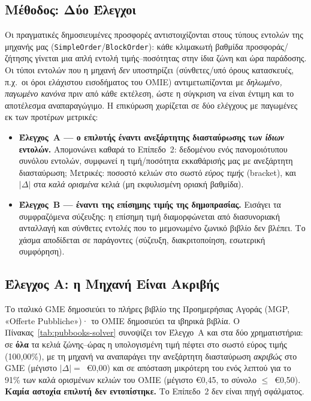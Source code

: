 \subsection{Μέθοδος: Δύο Έλεγχοι}
\label{subsec:pubbooks-method}

Οι πραγματικές δημοσιευμένες προσφορές αντιστοιχίζονται στους τύπους εντολών της μηχανής μας (\texttt{SimpleOrder}/\texttt{BlockOrder}): κάθε κλιμακωτή βαθμίδα προσφοράς/ζήτησης γίνεται μια απλή εντολή τιμής--ποσότητας στην ίδια ζώνη και ώρα παράδοσης. Οι τύποι εντολών που η μηχανή \emph{δεν} υποστηρίζει (σύνθετες/υπό όρους κατασκευές, π.χ.\ οι όροι ελάχιστου εισοδήματος του OMIE) αντιμετωπίζονται με \emph{δηλωμένο, παγωμένο κανόνα} πριν από κάθε εκτέλεση, ώστε η σύγκριση να είναι έντιμη και το αποτέλεσμα αναπαραγώγιμο. Η επικύρωση χωρίζεται σε δύο ελέγχους με παγωμένες εκ των προτέρων μετρικές:

\begin{itemize}
\item \textbf{Έλεγχος~Α --- ο επιλυτής έναντι ανεξάρτητης διασταύρωσης των \emph{ίδιων} εντολών.} Απομονώνει καθαρά το Επίπεδο~2: δεδομένου ενός πανομοιότυπου συνόλου εντολών, συμφωνεί η τιμή/ποσότητα εκκαθάρισής μας με ανεξάρτητη διασταύρωση; Μετρικές: ποσοστό κελιών στο σωστό \emph{εύρος τιμής} (bracket), και $|\Delta|$ στα \emph{καλά ορισμένα} κελιά (μη εκφυλισμένη οριακή βαθμίδα).
\item \textbf{Έλεγχος~Β --- έναντι της επίσημης τιμής της δημοπρασίας.} Εισάγει τα συμφραζόμενα σύζευξης: η επίσημη τιμή διαμορφώνεται από διασυνοριακή ανταλλαγή και σύνθετες εντολές που το μεμονωμένο ζωνικό βιβλίο δεν βλέπει. Το χάσμα αποδίδεται σε παράγοντες (σύζευξη, διακριτοποίηση, εσωτερική συμφόρηση).
\end{itemize}

\subsection{Έλεγχος Α: η Μηχανή Είναι Ακριβής}
\label{subsec:pubbooks-solver}

Το ιταλικό GME δημοσιεύει το πλήρες βιβλίο της Προημερήσιας Αγοράς (MGP, «Offerte Pubbliche»)· το OMIE δημοσιεύει τα ιβηρικά βιβλία. Ο Πίνακας~\ref{tab:pubbooks-solver} συνοψίζει τον Έλεγχο~Α και στα δύο χρηματιστήρια: σε \textbf{όλα} τα κελιά ζώνης--ώρας η υπολογισμένη τιμή πέφτει στο σωστό εύρος τιμής (100,00\%), με τη μηχανή να αναπαράγει την ανεξάρτητη διασταύρωση \emph{ακριβώς} στο GME (μέγιστο $|\Delta|=$~€0,00) και σε απόσταση μικρότερη του ενός λεπτού για το 91\% των καλά ορισμένων κελιών του OMIE (μέγιστο €0,45, το σύνολο $\le$~€0,50). \textbf{Καμία αστοχία επιλυτή δεν εντοπίστηκε.} Το Επίπεδο~2 δεν είναι πηγή σφάλματος.

